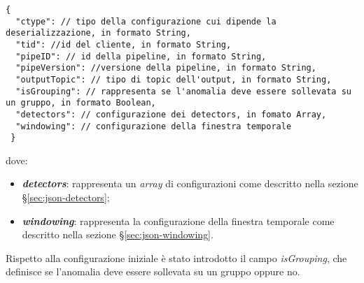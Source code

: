 \begin{verbatim}
{
  "ctype": // tipo della configurazione cui dipende la deserializzazione, in formato String,
  "tid": //id del cliente, in formato String, 
  "pipeID": // id della pipeline, in formato String, 
  "pipeVersion": //versione della pipeline, in formato String,
  "outputTopic": // tipo di topic dell'output, in formato String,
  "isGrouping": // rappresenta se l'anomalia deve essere sollevata su un gruppo, in formato Boolean,
  "detectors": // configurazione dei detectors, in fomato Array,
  "windowing": // configurazione della finestra temporale
 }
\end{verbatim}
dove:
\begin{itemize}
	\item{\textbf{\textit{detectors}}: rappresenta un \textit{array} di configurazioni come descritto nella sezione \S\ref{sec:json-detectors}};
	\item{\textbf{\textit{windowing}}: rappresenta la configurazione della finestra temporale come descritto nella sezione \S\ref{sec:json-windowing}.}
\end{itemize}

Rispetto alla configurazione iniziale è stato introdotto il campo \textit{isGrouping}, che definisce se l'anomalia deve essere sollevata su un gruppo oppure no. 

